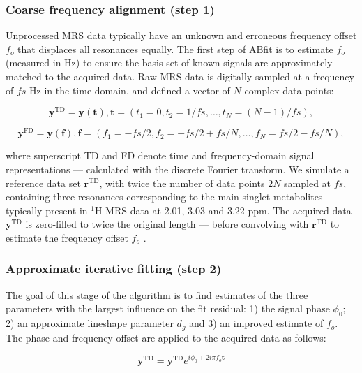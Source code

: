 \documentclass[num-refs]{wiley-article}
\newcommand{\revone}[2]{\hl{#1}\marginnote{\hl{#2}}}
\begin{document}
\subsubsection{Coarse frequency alignment (step 1)}
Unprocessed MRS data typically have an unknown and erroneous frequency offset $f_{o}$ that displaces all resonances equally. The first step of ABfit is to estimate $f_{o}$ (measured in Hz) to ensure the basis set of known signals are approximately matched to the acquired data. Raw MRS data is digitally sampled at a frequency of $\mathit{fs}$ Hz in the time-domain, and defined a vector of $N$ complex data points:

\begin{equation}
  \mathbf{y}^{\mathrm{TD}} = \mathbf{y}(\mathbf{t}), \mathbf{t}=(t_{1}=0,t_{2} =1/\mathit{fs},\ldots,t_{N}=(N-1)/\mathit{fs}),
\end{equation}

\begin{equation}
  \mathbf{y}^{\mathrm{FD}} = \mathbf{y}(\mathbf{f}), \mathbf{f}=(f_{1}=-\mathit{fs}/2,f_{2} =-\mathit{fs}/2 + \mathit{fs}/N ,\ldots,f_{N}=\mathit{fs}/2 - \mathit{fs}/N),
\end{equation}

where superscript TD and FD denote time and frequency-domain signal representations --- calculated with the discrete Fourier transform. We simulate a reference data set $\mathbf{r}^{\mathrm{TD}}$, with twice the number of data points $2N$ sampled at $\mathit{fs}$, containing three resonances corresponding to the main singlet metabolites typically present in $^1\mathrm{H}$ MRS data at 2.01, 3.03 and 3.22 ppm. The acquired data $\mathbf{y}^{\mathrm{TD}}$ is zero-filled to twice the original length --- before convolving with  $\mathbf{r}^{\mathrm{TD}}$ to estimate the frequency offset $f_{o}$ \revone{\cite{Provencher1993}}{R1.15}.

\subsubsection{Approximate iterative fitting (step 2)}
The goal of this stage of the algorithm is to find estimates of the three parameters with the largest influence on the fit residual: 1) the signal phase $\phi_{0}$; 2) an approximate lineshape parameter $d_{g}$ and 3) an improved estimate of $f_{o}$. The phase and frequency offset are applied to the acquired data as follows:

\begin{equation}
    \underline{\mathbf{y}}^{\mathrm{TD}} = \mathbf{y}^{\mathrm{TD}} e^{i \phi_{0} + 2 i \pi f_{o} \mathbf{t}}
\end{equation}
\end{document}
